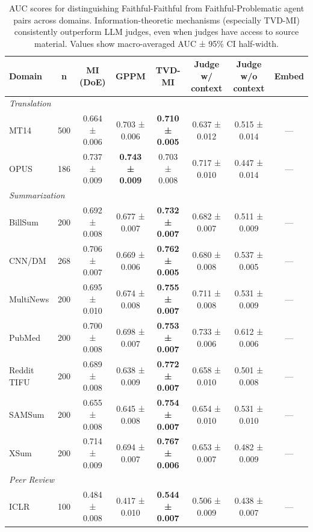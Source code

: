\begin{table}[t]
\centering
\caption{AUC scores for distinguishing Faithful-Faithful from Faithful-Problematic agent pairs across domains. Information-theoretic mechanisms (especially TVD-MI) consistently outperform LLM judges, even when judges have access to source material. Values show macro-averaged AUC ± 95\% CI half-width.}
\label{tab:auc_results}
\begin{tabular}{lccccccc}
\toprule
\textbf{Domain} & \textbf{n} & \textbf{MI (DoE)} & \textbf{GPPM} & \textbf{TVD-MI} & \textbf{Judge w/ context} & \textbf{Judge w/o context} & \textbf{Embed} \\
\midrule
\multicolumn{8}{l}{\textit{Translation}} \\
MT14 & 500 & 0.664 ± 0.006 & 0.703 ± 0.006 & \textbf{0.710 ± 0.005} & 0.637 ± 0.012 & 0.515 ± 0.014 & — \\
OPUS & 186 & 0.737 ± 0.009 & \textbf{0.743 ± 0.009} & 0.703 ± 0.008 & 0.717 ± 0.010 & 0.447 ± 0.014 & — \\
\midrule
\multicolumn{8}{l}{\textit{Summarization}} \\
BillSum & 200 & 0.692 ± 0.008 & 0.677 ± 0.007 & \textbf{0.732 ± 0.007} & 0.682 ± 0.007 & 0.511 ± 0.009 & — \\
CNN/DM & 268 & 0.706 ± 0.007 & 0.669 ± 0.006 & \textbf{0.762 ± 0.005} & 0.680 ± 0.008 & 0.537 ± 0.005 & — \\
MultiNews & 200 & 0.695 ± 0.010 & 0.674 ± 0.008 & \textbf{0.755 ± 0.007} & 0.711 ± 0.008 & 0.531 ± 0.009 & — \\
PubMed & 200 & 0.700 ± 0.008 & 0.698 ± 0.007 & \textbf{0.753 ± 0.007} & 0.733 ± 0.006 & 0.612 ± 0.006 & — \\
Reddit TIFU & 200 & 0.689 ± 0.008 & 0.638 ± 0.009 & \textbf{0.772 ± 0.007} & 0.658 ± 0.010 & 0.501 ± 0.008 & — \\
SAMSum & 200 & 0.655 ± 0.008 & 0.645 ± 0.008 & \textbf{0.754 ± 0.007} & 0.654 ± 0.010 & 0.531 ± 0.010 & — \\
XSum & 200 & 0.714 ± 0.009 & 0.694 ± 0.007 & \textbf{0.767 ± 0.006} & 0.653 ± 0.007 & 0.482 ± 0.009 & — \\
\midrule
\multicolumn{8}{l}{\textit{Peer Review}} \\
ICLR & 100 & 0.484 ± 0.008 & 0.417 ± 0.010 & \textbf{0.544 ± 0.007} & 0.506 ± 0.009 & 0.438 ± 0.007 & — \\
\bottomrule
\end{tabular}
\end{table}